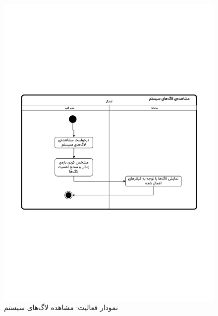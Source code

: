 \begin{figure}[ht!]
	\centering
	\includegraphics[scale=0.6, page=1]{figs/OOD-activity-syslog.pdf}
	\caption{نمودار فعالیت: مشاهده لاگ‌های سیستم}
\end{figure}
\FloatBarrier
\newpage

